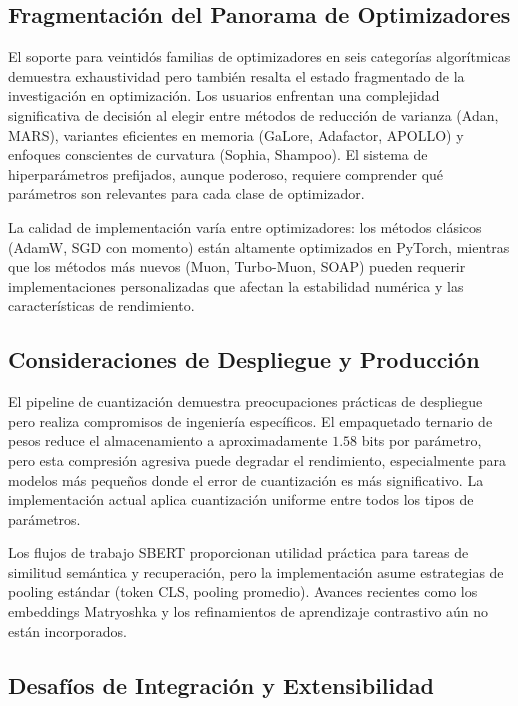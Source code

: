 \documentclass[11pt,a4paper]{article}
\begin{document}
\subsection{Fragmentación del Panorama de Optimizadores}

El soporte para veintidós familias de optimizadores en seis categorías algorítmicas demuestra exhaustividad pero también resalta el estado fragmentado de la investigación en optimización. Los usuarios enfrentan una complejidad significativa de decisión al elegir entre métodos de reducción de varianza (Adan, MARS), variantes eficientes en memoria (GaLore, Adafactor, APOLLO) y enfoques conscientes de curvatura (Sophia, Shampoo). El sistema de hiperparámetros prefijados, aunque poderoso, requiere comprender qué parámetros son relevantes para cada clase de optimizador.

La calidad de implementación varía entre optimizadores: los métodos clásicos (AdamW, SGD con momento) están altamente optimizados en PyTorch, mientras que los métodos más nuevos (Muon, Turbo-Muon, SOAP) pueden requerir implementaciones personalizadas que afectan la estabilidad numérica y las características de rendimiento.

\subsection{Consideraciones de Despliegue y Producción}

El pipeline de cuantización demuestra preocupaciones prácticas de despliegue pero realiza compromisos de ingeniería específicos. El empaquetado ternario de pesos reduce el almacenamiento a aproximadamente $1.58$ bits por parámetro, pero esta compresión agresiva puede degradar el rendimiento, especialmente para modelos más pequeños donde el error de cuantización es más significativo. La implementación actual aplica cuantización uniforme entre todos los tipos de parámetros.

Los flujos de trabajo SBERT proporcionan utilidad práctica para tareas de similitud semántica y recuperación, pero la implementación asume estrategias de pooling estándar (token CLS, pooling promedio). Avances recientes como los embeddings Matryoshka \citep{muennighoff_matryoshka_2021} y los refinamientos de aprendizaje contrastivo \citep{chen_supervised_2020} aún no están incorporados.

\subsection{Desafíos de Integración y Extensibilidad}
\end{document}
